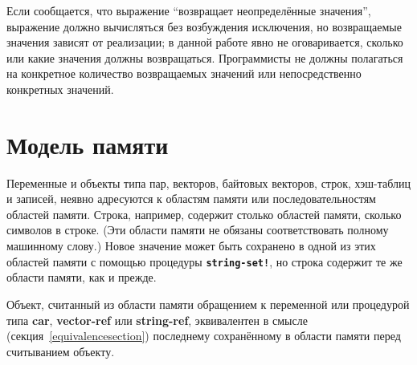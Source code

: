\vest Если сообщается, что выражение ``возвращает неопределённые значения'', выражение должно
вычисляться без возбуждения исключения, но возвращаемые значения зависят от реализации; в данной
работе явно не оговаривается, сколько или какие значения должны возвращаться. Программисты не
должны полагаться на конкретное количество возвращаемых значений или непосредственно конкретных
значений. \vspace{-4mm}

\section{Модель памяти}\vspace{-2mm}
\label{storagemodel}

Переменные и объекты типа пар, векторов, байтовых векторов, строк, хэш-таблиц и записей, неявно
адресуются к областям памяти или последовательностям областей памяти. Строка,
например, содержит столько областей памяти, сколько символов в строке. (Эти области памяти не
обязаны соответствовать полному машинному слову.) Новое значение может быть сохранено в одной из
этих областей памяти с помощью процедуры {\bfseries\tt string-set!}, но строка содержит те же
области памяти, как и прежде.

Объект, считанный из области памяти обращением к переменной или процедурой типа {\bfseries\cf
  car}, {\bfseries\cf vector-ref} или {\bfseries\cf string-ref}, эквивалентен в смысле
\textbf{} (секция~\ref{equivalencesection}) последнему сохранённому в области памяти перед
считыванием объекту.

